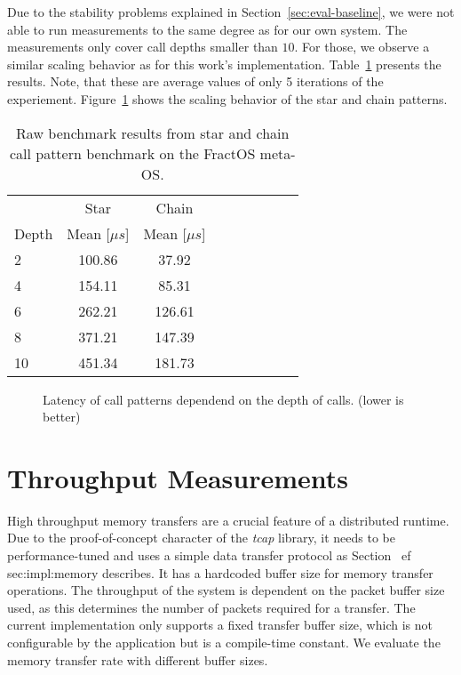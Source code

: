 Due to the stability problems explained in Section~\ref{sec:eval-baseline}, we were not able to run measurements to the same degree as for our own system. The measurements only cover call depths smaller than $10$. For those, we observe a similar scaling behavior as for this work's implementation. Table~\ref{tab:star-chain-fractos-results} presents the results. Note, that these are average values of only 5 iterations of the experiement. Figure~\ref{fig:eval-star-chain-fractos} shows the scaling behavior of the star and chain patterns.


\begin{table}[H]
  \centering
  \begin{tabular}{l|cccc|cccc}
    \toprule
    & \multicolumn{1}{c}{Star}&  \multicolumn{1}{c}{Chain} \\
    Depth & Mean [$\mu{}s$] & Mean  [$\mu{}s$]\\
    \midrule
    2& 100.86& 37.92\\
    4& 154.11&  85.31\\
    6 & 262.21& 126.61\\
    8& 371.21& 147.39\\
    10& 451.34& 181.73\\
    \bottomrule
  \end{tabular}
\vspace{1em}
  \caption{\label{tab:star-chain-fractos-results} Raw benchmark results from star and chain call pattern benchmark on the FractOS meta-\ac{OS}.}
\end{table}

\begin{figure}[H]
  \centering
  
  \caption{\label{fig:eval-star-chain-fractos} Latency of call patterns dependend on the depth of calls. (lower is better)}
\end{figure}

\section{Throughput Measurements}\label{sec:eval:throughput}
High throughput memory transfers are a crucial feature of a distributed runtime. Due to the proof-of-concept character of the \emph{tcap} library, it needs to be performance-tuned and uses a simple data transfer protocol as Section~ ef {sec:impl:memory} describes. It has a hardcoded buffer size for memory transfer operations. The throughput of the system is dependent on the packet buffer size used, as this determines the number of packets required for a transfer. The current implementation only supports a fixed transfer buffer size, which is not configurable by the application but is a compile-time constant. We evaluate the memory transfer rate with different buffer sizes.

